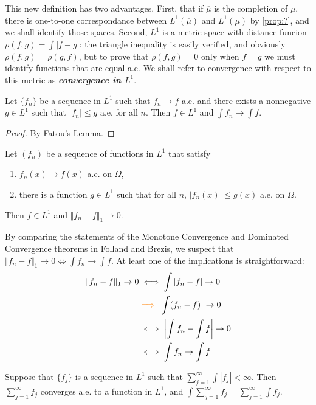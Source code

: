 \documentclass{article}
\theoremstyle{definition}
\numberwithin{equation}{section}
\begin{document}
		This new definition has two advantages. First, that if $\overline{\mu}$ is the completion of $\mu$, there is one-to-one correspondance between $L^1(\overline{\mu})$ and $L^1(\mu)$ by \cref{prop:?}, and we shall identify those spaces. Second, $L^1$ is a metric space with distance funcion $\rho(f,g)=\int|f-g|$: the triangle inequality is easily verified, and obviously $\rho(f,g)=\rho(g,f)$, but to prove that $\rho(f,g)=0$ only when $f=g$ we must identify functions that are equal a.e. We shall refer to convergence with respect to this metric as \textbf{\textit{convergence in $L^1$}}.
		\begin{thm}
			Let $\{f_n\}$ be a sequence in $L^1$ such that $f_n\to f$ a.e. and there exists a nonnegative $g\in L^1$ such that $|f_n|\leq g$ a.e. for all $n$. Then $f\in L^1$ and $\int f_n\to \int f$.
		\end{thm}
		\begin{proof}
			By Fatou's Lemma.
		\end{proof}
		\begin{thm}
			Let $(f_n)$ be a sequence of functions in $L^1$ that satisfy
			\begin{enumerate}
				\item $f_n(x)\to f(x)$ a.e. on $\Omega$,
				\item there is a function $g\in L^1$ such that for all $n$, $|f_n(x)|\leq g(x)$ a.e. on $\Omega$.
			\end{enumerate}
			Then $f\in L^1$ and $\Vert f_n-f\Vert_1\to0$.
		\end{thm}
		\begin{remark}
			By comparing the statements of the Monotone Convergence and Dominated Convergence theorems in Folland and Brezis, we suspect that $\Vert f_n-f\Vert_1\to 0\iff \int f_n\to \int f$. At least one of the implications is straightforward:
			\begin{align*}
				\Vert f_n-f\Vert_1\to 0&\iff \int |f_n-f|\to0\\
				&{\color{orange}\implies}\left|\int (f_n-f)\right|\to0\\
				&\iff \left|\int f_n-\int f\right|\to0\\
				&\iff\int f_n\to\int f
		\end{align*}
		\end{remark}
		\begin{thm}
			Suppose that $\{f_j\}$ is a sequence in $L^1$ such that $\sum_{j=1}^\infty\int|f_j|<\infty$. Then $\sum_{j=1}^\infty f_j$ converges a.e. to a function in $L^1$, and $\int\sum_{j=1}^\infty f_j=\sum_{j=1}^\infty\int f_j$.
		\end{thm}
\end{document}
